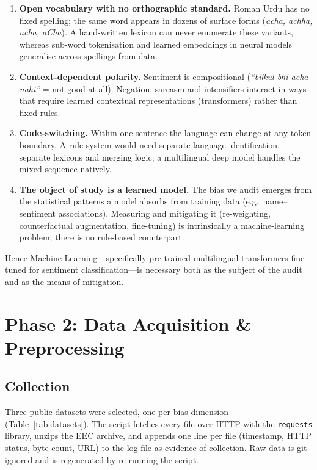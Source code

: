 \documentclass[11pt,a4paper]{article}
\begin{document}
\begin{enumerate}
  \item \textbf{Open vocabulary with no orthographic standard.} Roman Urdu has no fixed spelling;
        the same word appears in dozens of surface forms (\emph{acha, achha, acha, aCha}). A
        hand-written lexicon can never enumerate these variants, whereas sub-word tokenisation and
        learned embeddings in neural models generalise across spellings from data.
  \item \textbf{Context-dependent polarity.} Sentiment is compositional (\emph{``bilkul bhi acha
        nahi''} = not good at all). Negation, sarcasm and intensifiers interact in ways that
        require learned contextual representations (transformers) rather than fixed rules.
  \item \textbf{Code-switching.} Within one sentence the language can change at any token
        boundary. A rule system would need separate language identification, separate lexicons
        and merging logic; a multilingual deep model handles the mixed sequence natively.
  \item \textbf{The object of study is a learned model.} The bias we audit emerges from the
        statistical patterns a model absorbs from training data (e.g.\ name--sentiment
        associations). Measuring and mitigating it (re-weighting, counterfactual augmentation,
        fine-tuning) is intrinsically a machine-learning problem; there is no rule-based
        counterpart.
\end{enumerate}
Hence Machine Learning---specifically pre-trained multilingual transformers fine-tuned for
sentiment classification---is necessary both as the subject of the audit and as the means of
mitigation.

\section{Phase 2: Data Acquisition \& Preprocessing}

\subsection{Collection}
Three public datasets were selected, one per bias dimension (Table~\ref{tab:datasets}).
The script  fetches every file over HTTP with the
\texttt{requests} library, unzips the EEC archive, and appends one line per file (timestamp,
HTTP status, byte count, URL) to the log file  as evidence of
collection. Raw data is git-ignored and is regenerated by re-running the script.
\end{document}
